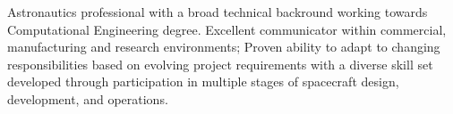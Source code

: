 


\begin{cvparagraph}
Astronautics professional with a broad technical backround working towards Computational Engineering degree. Excellent communicator within commercial, manufacturing and research environments; Proven ability to adapt to changing responsibilities based on evolving project requirements with a diverse skill set developed through participation in multiple stages of spacecraft design, development, and operations.
\end{cvparagraph}

